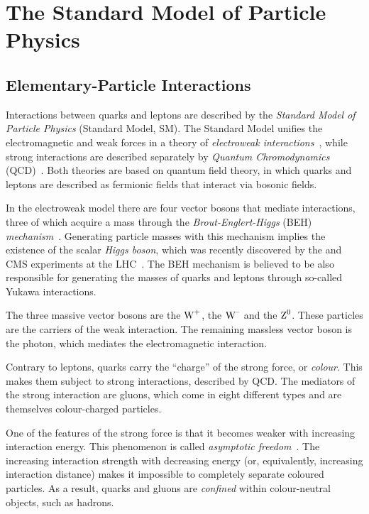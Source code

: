 \section{The Standard Model of Particle Physics}
\label{sec:intro_SM}

\subsection{Elementary-Particle Interactions}
\label{subsec:intro_SM_int}

Interactions between quarks and leptons are described by the \emph{Standard Model of Particle Physics} (Standard Model, SM). The Standard
Model unifies the electromagnetic and weak forces in a theory of \emph{electroweak
interactions}~\cite{Glashow:1961tr,*Weinberg:1967tq,*Salam:1968rm}, while strong interactions are described separately by \emph{Quantum
Chromodynamics} (QCD)~\cite{Fritzsch:1973pi}. Both theories are based on quantum field theory, in which quarks and leptons are described as
fermionic fields that interact via bosonic fields.

In the electroweak model there are four vector bosons that mediate interactions, three of which acquire a mass through the
\emph{Brout-Englert-Higgs} (BEH) \emph{mechanism}~\cite{Englert:1964et,*Higgs:1964ia,*Higgs:1964pj,*Guralnik:1964eu}. Generating particle
masses with this mechanism implies the existence of the scalar \emph{Higgs boson}, which was recently discovered by the \atlas{} and
CMS experiments at the LHC~\cite{Aad:2012tfa,*Chatrchyan:2012ufa}. The BEH mechanism is believed to be also responsible for generating the
masses of quarks and leptons through so-called Yukawa interactions.

The three massive vector bosons are the $\text{W}^{\text{+}}$, the $\text{W}^{\text{--}}$ and the $\text{Z}^{\text{0}}$. These particles are the carriers of the weak interaction. The
remaining massless vector boson is the photon, which mediates the electromagnetic interaction.

Contrary to leptons, quarks carry the ``charge'' of the strong force, or \emph{colour}. This makes them subject to strong interactions,
described by QCD. The mediators of the strong interaction are gluons, which come in eight different types and are themselves colour-charged
particles.

One of the features of the strong force is that it becomes weaker with increasing interaction energy. This phenomenon is called
\emph{asymptotic freedom}~\cite{Gross:1973id,*Politzer:1973fx}. The increasing interaction strength with decreasing energy (or,
equivalently, increasing interaction distance) makes it impossible to completely separate coloured particles. As a result, quarks and
gluons are \emph{confined} within colour-neutral objects, such as hadrons.

